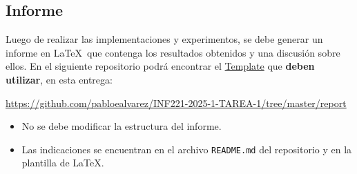 \subsection{Informe} \label{subsec:report}

Luego de realizar las implementaciones y experimentos, se debe generar un informe en \LaTeX\ que contenga los resultados obtenidos y una discusión sobre ellos. En el siguiente repositorio podrá encontrar el \href{https://github.com/pabloealvarez/INF221-2025-1-TAREA-1/tree/master/report}{Template} que \textbf{deben utilizar}, en esta entrega:

\begin{mdframed}

\begin{center}
    
    \url{https://github.com/pabloealvarez/INF221-2025-1-TAREA-1/tree/master/report}
        
\end{center}
\end{mdframed}

\begin{itemize}
    \item No se debe modificar la estructura del informe.
    \item Las indicaciones se encuentran en el archivo \texttt{README.md} del repositorio y en la plantilla de \LaTeX. 
\end{itemize}

